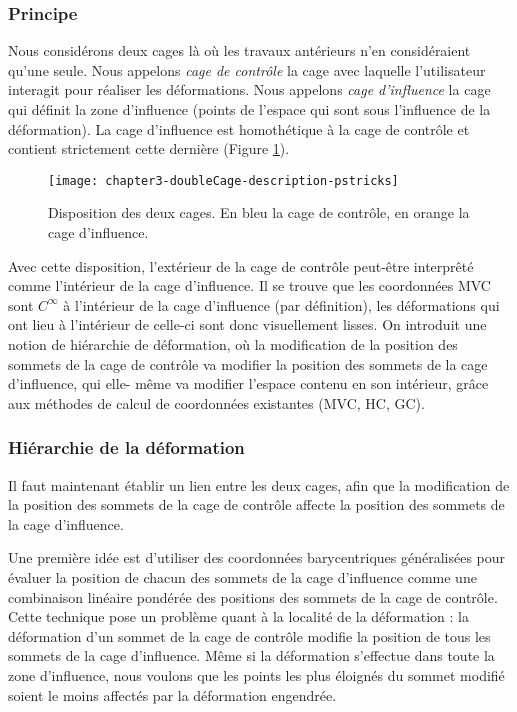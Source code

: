 \subsubsection{Principe}

Nous considérons deux cages là où les travaux antérieurs n'en considéraient
qu'une seule. Nous appelons \textit{cage de contrôle} la cage avec laquelle
l'utilisateur interagit pour réaliser les déformations. Nous appelons
\textit{cage d'influence} la cage qui définit la zone d'influence (points de
l'espace qui sont sous l'influence de la déformation). La cage d'influence est
homothétique à la cage de contrôle et contient strictement cette dernière
(Figure \ref{MELDou}).

\begin{figure}[ht]
  \begin{center}
    \texttt{[image: chapter3-doubleCage-description-pstricks]}

    \caption[Disposition des cages de contrôle et d'influence] {Disposition
des deux cages. En bleu la cage de contrôle, en orange la cage d'influence.}

    \label{MELDou}
  \end{center}
\end{figure}

Avec cette disposition, l'extérieur de la cage de contrôle peut-être
interprêté comme l'intérieur de la cage d'influence. Il se trouve que les
coordonnées MVC sont $C^{\infty}$ à l'intérieur de la cage d'influence (par
définition), les déformations qui ont lieu à l'intérieur de celle-ci sont donc
visuellement lisses. On introduit une notion de hiérarchie de déformation, où
la modification de la position des sommets de la cage de contrôle va modifier
la position des sommets de la cage d'influence, qui elle- même va modifier
l'espace contenu en son intérieur, grâce aux méthodes de calcul de coordonnées
existantes (MVC, HC, GC). \\

\subsubsection{Hiérarchie de la déformation}

Il faut maintenant établir un lien entre les deux cages, afin que la
modification de la position des sommets de la cage de contrôle affecte la
position des sommets de la cage d'influence.

Une première idée est d'utiliser des coordonnées barycentriques généralisées
pour évaluer la position de chacun des sommets de la cage d'influence comme
une combinaison linéaire pondérée des positions des sommets de la cage de
contrôle. Cette technique pose un problème quant à la localité de la
déformation : la déformation d'un sommet de la cage de contrôle modifie la
position de tous les sommets de la cage d'influence. Même si la déformation
s'effectue dans toute la zone d'influence, nous voulons que les points les
plus éloignés du sommet modifié soient le moins affectés par la déformation
engendrée.

